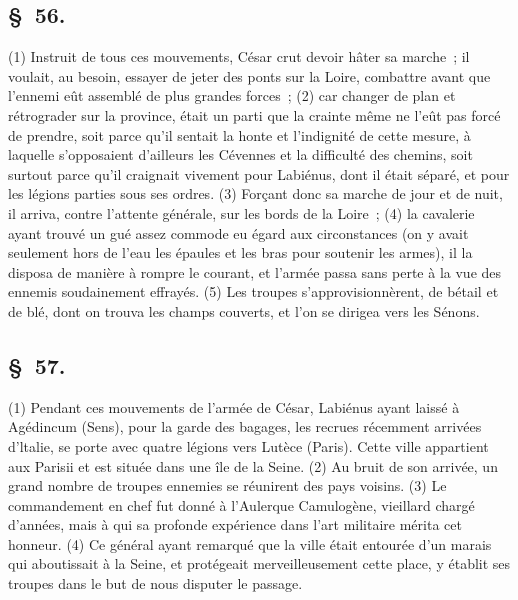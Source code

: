 \documentclass[french,twoside]{book} %
\begin{document}
\subsection[{§ 56.}]{ \textsc{§ 56.} }
\noindent (1) Instruit de tous ces mouvements, César crut devoir hâter sa marche ; il voulait, au besoin, essayer de jeter des ponts sur la Loire, combattre avant que l’ennemi eût assemblé de plus grandes forces ; (2) car changer de plan et rétrograder sur la province, était un parti que la crainte même ne l’eût pas forcé de prendre, soit parce qu’il sentait la honte et l’indignité de cette mesure, à laquelle s’opposaient d’ailleurs les Cévennes et la difficulté des chemins, soit surtout parce qu’il craignait vivement pour Labiénus, dont il était séparé, et pour les légions parties sous ses ordres. (3) Forçant donc sa marche de jour et de nuit, il arriva, contre l’attente générale, sur les bords de la Loire ; (4) la cavalerie ayant trouvé un gué assez commode eu égard aux circonstances (on y avait seulement hors de l’eau les épaules et les bras pour soutenir les armes), il la disposa de manière à rompre le courant, et l’armée passa sans perte à la vue des ennemis soudainement effrayés. (5) Les troupes s’approvisionnèrent, de bétail et de blé, dont on trouva les champs couverts, et l’on se dirigea vers les Sénons.
\subsection[{§ 57.}]{ \textsc{§ 57.} }
\noindent (1) Pendant ces mouvements de l’armée de César, Labiénus ayant laissé à Agédincum (Sens), pour la garde des bagages, les recrues récemment arrivées d’ltalie, se porte avec quatre légions vers Lutèce (Paris). Cette ville appartient aux Parisii et est située dans une île de la Seine. (2) Au bruit de son arrivée, un grand nombre de troupes ennemies se réunirent des pays voisins. (3) Le commandement en chef fut donné à l’Aulerque Camulogène, vieillard chargé d’années, mais à qui sa profonde expérience dans l’art militaire mérita cet honneur. (4) Ce général ayant remarqué que la ville était entourée d’un marais qui aboutissait à la Seine, et protégeait merveilleusement cette place, y établit ses troupes dans le but de nous disputer le passage.
\end{document}
